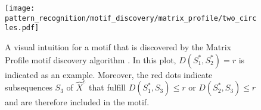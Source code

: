 \begin{figure}[htb]
\centering
\texttt{[image: pattern\_recognition/motif\_discovery/matrix\_profile/two\_circles.pdf]}
\caption[Matrix Profile - Motif]{A visual intuition for a motif that is discovered by the Matrix Profile motif discovery algorithm \cite{Random_Projection}. In this plot, $D(S_{1}^*,S_{2}^*) = r$ is indicated as an example. Moreover, the red dots indicate subsequences $S_3$ of $\hat{X}^e$ that fulfill $D(S_{1}^*,S_{3}) \leq r$ or $D(S_{2}^*,S_{3}) \leq r$ and are therefore included in the motif.}
\label{fig:two_circles}
\end{figure}







